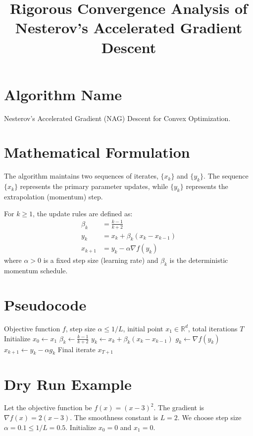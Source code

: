 \documentclass[11pt]{article}
\title{Rigorous Convergence Analysis of Nesterov's Accelerated Gradient Descent}
\date{}
\begin{document}
\maketitle

\section*{Algorithm Name}
Nesterov's Accelerated Gradient (NAG) Descent for Convex Optimization.

\section*{Mathematical Formulation}
The algorithm maintains two sequences of iterates, $\{x_k\}$ and $\{y_k\}$. The sequence $\{x_k\}$ represents the primary parameter updates, while $\{y_k\}$ represents the extrapolation (momentum) step. 

For $k \ge 1$, the update rules are defined as:
\begin{align*}
    \beta_k &= \frac{k-1}{k+2} \\
    y_k &= x_k + \beta_k (x_k - x_{k-1}) \\
    x_{k+1} &= y_k - \alpha \nabla f(y_k)
\end{align*}
where $\alpha > 0$ is a fixed step size (learning rate) and $\beta_k$ is the deterministic momentum schedule.

\section*{Pseudocode}
\begin{algorithm}[H]
\caption{Nesterov's Accelerated Gradient Descent}
\begin{algorithmic}[1]
\Require Objective function $f$, step size $\alpha \leq 1/L$, initial point $x_1 \in \mathbb{R}^d$, total iterations $T$
\State Initialize $x_0 \gets x_1$ 
    \State $\beta_k \gets \frac{k-1}{k+2}$
    \State $y_k \gets x_k + \beta_k (x_k - x_{k-1})$ 
    \State $g_k \gets \nabla f(y_k)$ 
    \State $x_{k+1} \gets y_k - \alpha g_k$ 
\EndFor
\Ensure Final iterate $x_{T+1}$
\end{algorithmic}
\end{algorithm}

\section*{Dry Run Example}
Let the objective function be $f(x) = (x-3)^2$. The gradient is $\nabla f(x) = 2(x-3)$. The smoothness constant is $L = 2$.
We choose step size $\alpha = 0.1 \leq 1/L = 0.5$.
Initialize $x_0 = 0$ and $x_1 = 0$.
\end{document}
